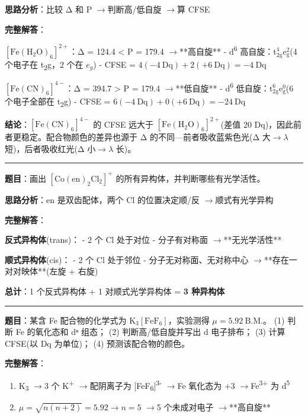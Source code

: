 \documentclass[a4paper,11pt]{ctexart}
\newcommand{\箭}{\ensuremath{\rightarrow}}
\newcommand{\左箭}{\ensuremath{\leftarrow}}
\newcommand{\上箭}{\ensuremath{\uparrow}}
\newcommand{\下箭}{\ensuremath{\downarrow}}
\newcommand{\衡}{\ensuremath{\rightleftharpoons}}
\newcommand{\双箭}{\ensuremath{\leftrightarrow}}
\newcommand{\约等于}{\ensuremath{\approx}}
\newcommand{\小于等于}{\ensuremath{\leq}}
\newcommand{\大于等于}{\ensuremath{\geq}}
\newcommand{\不等于}{\ensuremath{\neq}}
\newcommand{\西格马}{\ensuremath{\sigma}}
\newcommand{\派}{\ensuremath{\pi}}
\begin{document}
\textbf{思路分析}：比较 Δ 和 P \箭 判断高/低自旋 \箭 算 CFSE

\textbf{完整解答}：

\textbf{\([\mathrm{Fe(H_2O)_6}]^{2+}\)}：Δ = 124.4 \textless{} P = 179.4 \箭 **高自旋**
- d\textsuperscript{6} 高自旋：\(\mathrm{t_{2g}^4 e_g^2}\)(4 个电子在 t\textsubscript{2}g，2 个在 \(e_g\))
- CFSE = \(4(-4\ \mathrm{Dq}) + 2(+6\ \mathrm{Dq}) = -4\ \mathrm{Dq}\)

\textbf{\([\mathrm{Fe(CN)_6}]^{4-}\)}：Δ = 394.7 \textgreater{} P = 179.4 \箭 **低自旋**
- d\textsuperscript{6} 低自旋：\(\mathrm{t_{2g}^6 e_g^0}\)(6 个电子全部在 t\textsubscript{2}g)
- CFSE = \(6(-4\ \mathrm{Dq}) + 0(+6\ \mathrm{Dq}) = -24\ \mathrm{Dq}\)

\textbf{结论}：\([\mathrm{Fe(CN)_6}]^{4-}\) 的 CFSE 远大于 \([\mathrm{Fe(H_2O)_6}]^{2+}\)(差值 20 Dq)，因此前者更稳定。配合物颜色的差异也源于 Δ 的不同---前者吸收蓝紫色光(Δ 大\箭\(\lambda\) 短)，后者吸收红光(Δ 小\箭\(\lambda\) 长)。

\begin{center}\rule{0.5\linewidth}{0.5pt}\end{center}

\textbf{题目}：画出 \([\mathrm{Co(en)_2Cl_2}]^+\) 的所有异构体，并判断哪些有光学活性。

\textbf{思路分析}：en 是双齿配体，两个 Cl 的位置决定顺/反 \箭 顺式有光学异构

\textbf{完整解答}：

\textbf{反式异构体}(trans)：
- 2 个 Cl 处于对位
- 分子有对称面 \箭 **无光学活性**

\textbf{顺式异构体}(cis)：
- 2 个 Cl 处于邻位
- 分子无对称面、无对称中心 \箭 **存在一对对映体**(左旋 + 右旋)

\textbf{总计}：1 个反式异构体 + 1 对顺式光学异构体 = \textbf{3 种异构体}

\begin{center}\rule{0.5\linewidth}{0.5pt}\end{center}

\textbf{题目}：某含 Fe 配合物的化学式为 \(\mathrm{K_3[FeF_6]}\)，实验测得 \(\mu = 5.92\ \mathrm{B.M.}\)。
(1) 判断 Fe 的氧化态和 dⁿ 组态；
(2) 判断高/低自旋并写出 d 电子排布；
(3) 计算 CFSE(以 Dq 为单位)；
(4) 预测该配合物的颜色。

\textbf{完整解答}：

\begin{enumerate}
\def\labelenumi{(\arabic{enumi})}
\item
  K\textsubscript{3} \箭 3 个 K\textsuperscript{+} \箭 配阴离子为 {[}FeF\textsubscript{6}{]}\textsuperscript{3-} \箭 Fe 氧化态为 +3 \箭 Fe\textsuperscript{3+} 为 d\textsuperscript{5}
\item
  \(\mu = \sqrt{n(n+2)} = 5.92 \rightarrow n = 5\) \箭 5 个未成对电子 \箭 **高自旋**
\end{enumerate}
\end{document}
